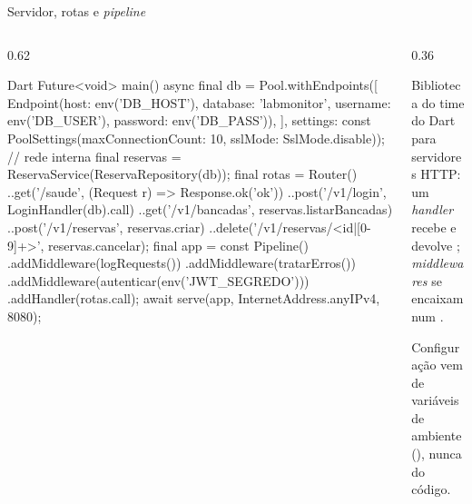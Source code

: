 \documentclass[aspectratio=169,10pt]{beamer}
\begin{document}
\begin{frame}[fragile]{Servidor, rotas e \emph{pipeline}}
  \begin{columns}[T]
    \begin{column}{0.62\textwidth}
\begin{codigo}[title=bin/server.dart]{Dart}
Future<void> main() async {
  final db = Pool.withEndpoints([
    Endpoint(host: env('DB_HOST'), database: 'labmonitor',
        username: env('DB_USER'), password: env('DB_PASS')),
  ], settings: const PoolSettings(maxConnectionCount: 10,
      sslMode: SslMode.disable));            // rede interna
  final reservas = ReservaService(ReservaRepository(db));
  final rotas = Router()
    ..get('/saude', (Request r) => Response.ok('ok'))
    ..post('/v1/login', LoginHandler(db).call)
    ..get('/v1/bancadas', reservas.listarBancadas)
    ..post('/v1/reservas', reservas.criar)
    ..delete('/v1/reservas/<id|[0-9]+>', reservas.cancelar);
  final app = const Pipeline()
      .addMiddleware(logRequests())
      .addMiddleware(tratarErros())
      .addMiddleware(autenticar(env('JWT_SEGREDO')))
      .addHandler(rotas.call);
  await serve(app, InternetAddress.anyIPv4, 8080);
}
\end{codigo}
    \end{column}
    \begin{column}{0.36\textwidth}
      \begin{conceito}[Shelf]
        Biblioteca do time do Dart para servidores HTTP: um \emph{handler} recebe  e devolve ; \emph{middlewares} se encaixam num .
      \end{conceito}
      \begin{dica}
        Configuração vem de variáveis de ambiente (), nunca do código.
      \end{dica}
    \end{column}
  \end{columns}
\end{frame}
\end{document}
